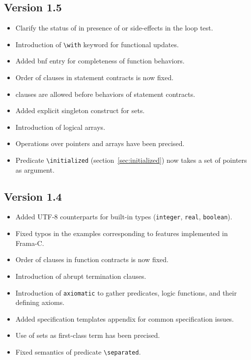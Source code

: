 \documentclass[web]{frama-c-book}
\begin{document}
\subsection{Version 1.5}

\begin{itemize}
\item Clarify the status of \Loop \invariant in presence of
  \Break or side-effects in the loop test.
\item Introduction of \lstinline|\with| keyword for functional updates.
\item Added bnf entry for completeness of function behaviors.
\item Order of clauses in statement contracts is now fixed.
\item \requires clauses are allowed before behaviors of statement contracts.
\item Added explicit singleton construct for sets.
\item Introduction of logical arrays.
\item Operations over pointers and arrays have been precised.
\item Predicate \lstinline|\initialized| (section~\ref{sec:initialized})
  now takes a set of pointers as argument.
\end{itemize}

\subsection{Version 1.4}
\begin{itemize}
\item Added UTF-8 counterparts for built-in types
  (\lstinline|integer|, \lstinline|real|, \lstinline|boolean|).
\item Fixed typos in the examples corresponding to features
  implemented in Frama-C.
\item Order of clauses in function contracts is now fixed.
\item Introduction of abrupt termination clauses.
\item Introduction of \lstinline|axiomatic| to gather predicates, logic
  functions, and their defining axioms.
\item Added specification templates appendix for common specification issues.
\item Use of sets as first-class term has been precised.
\item Fixed semantics of predicate \lstinline|\separated|.
\end{itemize}
\end{document}

